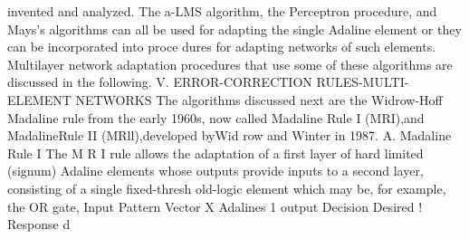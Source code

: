 \documentclass[11pt,a4paper,twocolumn]{article}
\begin{document}
invented and analyzed. 
The a-LMS algorithm, the Perceptron procedure, and 
Mays's algorithms can all be used for adapting the single 
Adaline element or they can be incorporated into proce
dures for adapting networks of such elements. Multilayer 
network adaptation procedures that use some of these 
algorithms are discussed in the following. 
V. ERROR-CORRECTION 
RULES-MULTI-ELEMENT NETWORKS 
The algorithms discussed next are the Widrow-Hoff 
Madaline rule from the early 1960s, now called Madaline 
Rule I (MRI),and MadalineRule II (MRll),developed byWid
row and Winter in 1987. 
A. Madaline Rule I 
The M R I  rule allows the adaptation of a first layer of hard
limited (signum) Adaline elements whose outputs provide 
inputs to a second layer, consisting of a single fixed-thresh
old-logic element which may be, for example, the OR gate, 
Input 
Pattern 
Vector 
X 
Adalines 
1 
output 
Decision 
Desired 
! 
Response 
d 
\end{document}
